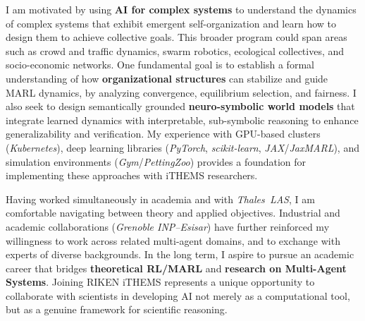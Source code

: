 \documentclass[11pt,a4paper,sans]{moderncv}
\begin{document}
I am motivated by using \textbf{AI for complex systems} to understand the dynamics of complex systems that exhibit emergent self-organization and learn how to design them to achieve collective goals. This broader program could span areas such as crowd and traffic dynamics, swarm robotics, ecological collectives, and socio-economic networks. One fundamental goal is to establish a formal understanding of how \textbf{organizational structures} can stabilize and guide MARL dynamics, by analyzing convergence, equilibrium selection, and fairness. I also seek to design semantically grounded \textbf{neuro-symbolic world models} that integrate learned dynamics with interpretable, sub-symbolic reasoning to enhance generalizability and verification. My experience with GPU-based clusters (\textit{Kubernetes}), deep learning libraries (\textit{PyTorch}, \textit{scikit-learn}, \textit{JAX}/\textit{JaxMARL}), and simulation environments (\textit{Gym}/\textit{PettingZoo}) provides a foundation for implementing these approaches with iTHEMS researchers.

Having worked simultaneously in academia and with \textit{Thales~LAS}, I am comfortable navigating between theory and applied objectives. Industrial and academic collaborations (\textit{Grenoble INP--Esisar}) have further reinforced my willingness to work across related multi-agent domains, and to exchange with experts of diverse backgrounds.
%
In the long term, I aspire to pursue an academic career that bridges \textbf{theoretical RL/MARL} and \textbf{research on Multi-Agent Systems}. Joining RIKEN iTHEMS represents a unique opportunity to collaborate with scientists in developing AI not merely as a computational tool, but as a genuine framework for scientific reasoning.



\makeletterclosing
\end{document}

